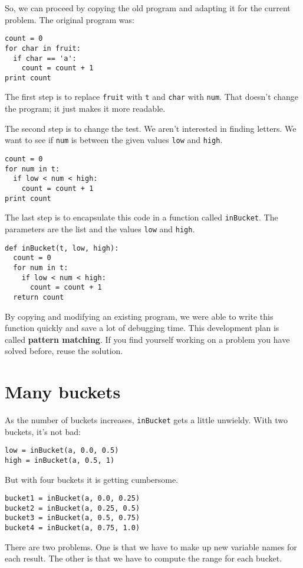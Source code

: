 So, we can proceed by copying the old program and adapting it
for the current problem.  The original program was:

\beforeverb
\begin{verbatim}
count = 0
for char in fruit:
  if char == 'a':
    count = count + 1
print count
\end{verbatim}
\afterverb
%
The first step is to replace {\tt fruit} with {\tt t} and
{\tt char} with {\tt num}.  That doesn't change the program;
it just makes it more readable.

The second step is to change the test.  We aren't interested
in finding letters.  We want to see if {\tt num} is between
the given values {\tt low} and {\tt high}.  

\beforeverb
\begin{verbatim}
count = 0
for num in t:
  if low < num < high:
    count = count + 1
print count
\end{verbatim}
\afterverb
%
The last step is to encapsulate this code in a function called
{\tt inBucket}.  The parameters are the list and the values
{\tt low} and {\tt high}.

\beforeverb
\begin{verbatim}
def inBucket(t, low, high):
  count = 0
  for num in t:
    if low < num < high:
      count = count + 1
  return count
\end{verbatim}
\afterverb
%
By copying and modifying an existing program, we were able
to write this function quickly and save a lot of debugging
time.  This development plan is called {\bf pattern matching}.
If you find yourself working on a problem you have solved
before, reuse the solution.


\section{Many buckets}

As the number of buckets increases, {\tt inBucket} gets
a little unwieldy.  With two buckets, it's not bad:

\beforeverb
\begin{verbatim}
low = inBucket(a, 0.0, 0.5)
high = inBucket(a, 0.5, 1)
\end{verbatim}
\afterverb
%
But with four buckets it is getting cumbersome.

\beforeverb
\begin{verbatim}
bucket1 = inBucket(a, 0.0, 0.25)
bucket2 = inBucket(a, 0.25, 0.5)
bucket3 = inBucket(a, 0.5, 0.75)
bucket4 = inBucket(a, 0.75, 1.0)
\end{verbatim}
\afterverb
%
There are two problems.  One is that we have to make up new
variable names for each result.  The other is that we have to
compute the range for each bucket.

